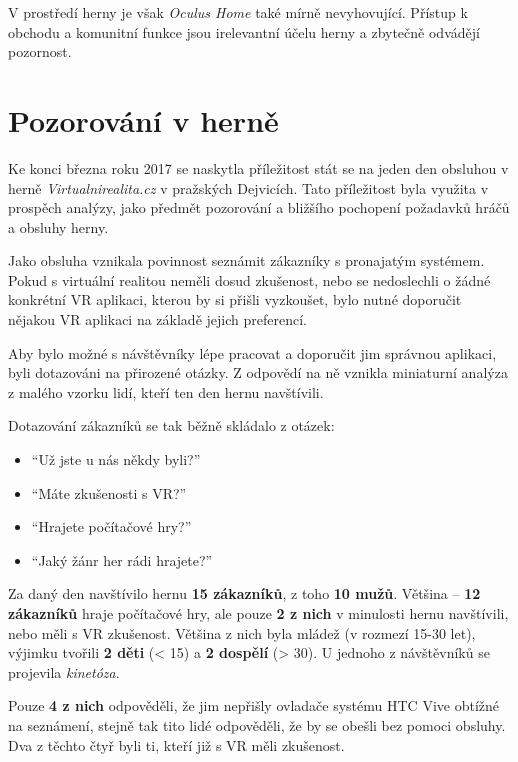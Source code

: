 V prostředí herny je však \emph{Oculus Home} také mírně nevyhovující.
Přístup k obchodu a komunitní funkce jsou irelevantní účelu herny a
zbytečně odvádějí pozornost.

\section{Pozorování v herně}\label{pozorovuxe1nuxed-v-hernux11b}

Ke konci března roku 2017 se naskytla příležitost stát se na jeden den
obsluhou v herně \emph{Virtualnirealita.cz} v pražských Dejvicích. Tato
příležitost byla využita v prospěch analýzy, jako předmět pozorování a
bližšího pochopení požadavků hráčů a obsluhy herny.

Jako obsluha vznikala povinnost seznámit zákazníky s pronajatým
systémem. Pokud s virtuální realitou neměli dosud zkušenost, nebo se
nedoslechli o žádné konkrétní VR aplikaci, kterou by si přišli
vyzkoušet, bylo nutné doporučit nějakou VR aplikaci na základě jejich
preferencí.

Aby bylo možné s návštěvníky lépe pracovat a doporučit jim správnou
aplikaci, byli dotazováni na přirozené otázky. Z odpovědí na ně vznikla
miniaturní analýza z malého vzorku lidí, kteří ten den hernu navštívili.

Dotazování zákazníků se tak běžně skládalo z otázek: 

\begin{itemize}
\tightlist
\item
``Už jste u nás
někdy byli?''
\item
  ``Máte zkušenosti s VR?''
\item
  ``Hrajete počítačové hry?''
\item
  ``Jaký žánr her rádi hrajete?''
\end{itemize}

Za daný den navštívilo hernu \textbf{15 zákazníků}, z toho \textbf{10
mužů}. Většina -- \textbf{12 zákazníků} hraje počítačové hry, ale pouze
\textbf{2 z nich} v minulosti hernu navštívili, nebo měli s VR
zkušenost. Většina z nich byla mládež (v rozmezí 15-30 let), výjimku
tvořili \textbf{2 děti} (\textless{} 15) a \textbf{2 dospělí}
(\textgreater{} 30). U jednoho z návštěvníků se projevila
\emph{kinetóza}.

Pouze \textbf{4 z nich} odpověděli, že jim nepřišly ovladače systému HTC
Vive obtížné na seznámení, stejně tak tito lidé odpověděli, že by se
obešli bez pomoci obsluhy. Dva z těchto čtyř byli ti, kteří již s VR
měli zkušenost.


